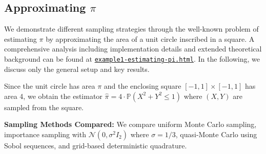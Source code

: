 \subsection{Approximating $\pi$}
\label{approx-pi}

We demonstrate different sampling strategies through the well-known problem of estimating $\pi$ by approximating the area of a unit circle inscribed in a square. A comprehensive analysis including implementation details and extended theoretical background can be found at \href{https://nikogerman.github.io/Seminar/Notebooks/example1-estimating-pi.html}{\texttt{example1-estimating-pi.html}}. In the following, we discuss only the general setup and key results.

Since the unit circle has area $\pi$ and the enclosing square $[-1,1] \times [-1,1]$ has area 4, we obtain the estimator $\hat{\pi} = 4 \cdot \mathbb{P}(X^2 + Y^2 \leq 1)$ where $(X,Y)$ are sampled from the square.

\textbf{Sampling Methods Compared:} We compare uniform Monte Carlo sampling, importance sampling with $\mathcal{N}(0, \sigma^2 I_2)$ where $\sigma = 1/3$, quasi-Monte Carlo using Sobol sequences, and grid-based deterministic quadrature.

